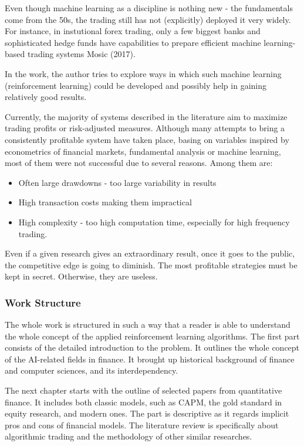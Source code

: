 \documentclass[]{article}
\providecommand{\tightlist}{%
  \setlength{\itemsep}{0pt}\setlength{\parskip}{0pt}}
\begin{document}
Even though machine learning as a discipline is nothing new - the
fundamentals come from the 50s, the trading still has not (explicitly)
deployed it very widely. For instance, in instutional forex trading,
only a few biggest banks and sophisticated hedge funds have capabilities
to prepare efficient machine learning-based trading systems Mosic
(2017).

In the work, the author tries to explore ways in which such machine
learning (reinforcement learning) could be developed and possibly help
in gaining relatively good results.

Currently, the majority of systems described in the literature aim to
maximize trading profits or risk-adjusted measures. Although many
attempts to bring a consistently profitable system have taken place,
basing on variables inspired by econometrics of financial markets,
fundamental analysis or machine learning, most of them were not
successful due to several reasons. Among them are:

\begin{itemize}
\tightlist
\item
  Often large drawdowns - too large variability in results
\item
  High transaction costs making them impractical
\item
  High complexity - too high computation time, especially for high
  frequency trading.
\end{itemize}

Even if a given research gives an extraordinary result, once it goes to
the public, the competitive edge is going to diminish. The most
profitable strategies must be kept in secret. Otherwise, they are
useless.

\subsubsection{Work Structure}\label{work-structure}

The whole work is structured in such a way that a reader is able to
understand the whole concept of the applied reinforcement learning
algorithms. The first part consists of the detailed introduction to the
problem. It outlines the whole concept of the AI-related fields in
finance. It brought up historical background of finance and computer
sciences, and its interdependency.

The next chapter starts with the outline of selected papers from
quantitative finance. It includes both classic models, such as CAPM, the
gold standard in equity research, and modern ones. The part is
descriptive as it regards implicit pros and cons of financial models.
The literature review is specifically about algorithmic trading and the
methodology of other similar researches.
\end{document}

